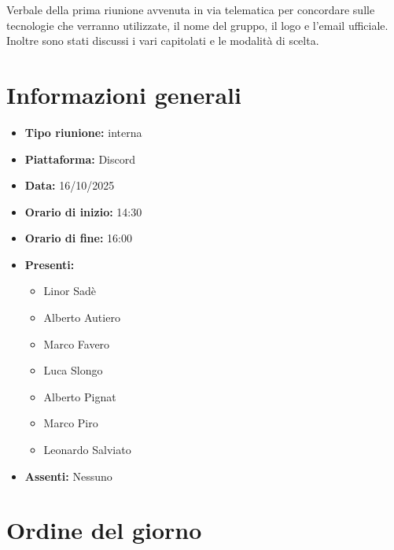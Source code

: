 \documentclass[a4paper,12pt]{article}
\begin{document}
\vspace{0.5cm}

\begin{center}
\begin{tcolorbox}[colback=secondaryblue!10,colframe=secondaryblue,width=0.9\textwidth,arc=3mm,boxrule=0.8pt,title={\bfseries Abstract}]
Verbale della prima riunione avvenuta in via telematica per concordare sulle tecnologie che verranno utilizzate, il nome del gruppo, il logo e l'email ufficiale. Inoltre sono stati discussi i vari capitolati e le modalità di scelta.
\end{tcolorbox}
\end{center}

\newpage

\tableofcontents
\newpage

\section{Informazioni generali}

\begin{itemize}
    \item \textbf{Tipo riunione:} interna
    \item \textbf{Piattaforma:} Discord
    \item \textbf{Data:} 16/10/2025
    \item \textbf{Orario di inizio:} 14:30
    \item \textbf{Orario di fine:} 16:00
    \item \textbf{Presenti:}
    \begin{itemize}[leftmargin=1.5em, itemsep=3pt, label={\rule[0.5ex]{0.4em}{0.4em}}]
        \item Linor Sadè
        \item Alberto Autiero
        \item Marco Favero
        \item Luca Slongo
        \item Alberto Pignat
        \item Marco Piro
        \item Leonardo Salviato
    \end{itemize}
    \item \textbf{Assenti:} Nessuno
\end{itemize}

\section{Ordine del giorno}
\end{document}

